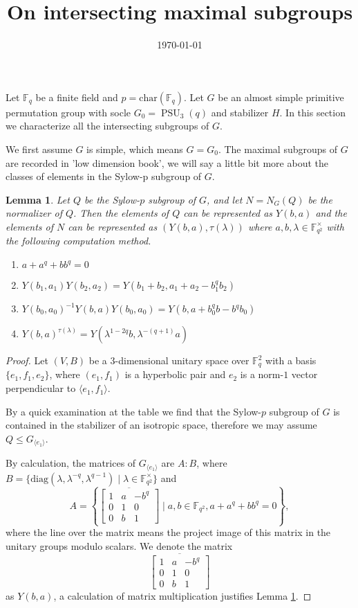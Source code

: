 \documentclass[12pt,reqno]{amsart}
\title[On intersecting maximal subgroups]{On intersecting maximal subgroups}
\date{\today}
\newcommand{\PSU}{\operatorname{PSU}}
\newcommand{\FF}{\mathbb{F}}
\newcommand{\lr}{\langle}
\newcommand{\rr}{\rangle}
\theoremstyle{plain}
\newtheorem{lemma}[proposition]{Lemma}
\theoremstyle{definition}
\begin{document}
	Let $\FF_q$ be a finite field and $p=\mathrm{char}(\FF_q)$. Let $G$ be an almost simple primitive permutation group with socle $G_0=\PSU_3(q)$ and stabilizer $H$. In this section we characterize all the intersecting subgroups of $G$. 
	
	We first assume  $G$ is simple, which means $G=G_0$. The maximal subgroups of $G$ are recorded in 'low dimension book', we will say a little bit more about the classes of elements in the Sylow-p subgroup of $G$.
	
	\begin{lemma}\label{Syl_p}
		Let $Q$ be the Sylow-$p$ subgroup of $G$, and let $N=N_G(Q)$ be the normalizer of $Q$. Then the elements of $Q$ can be represented as $Y(b,a)$ and the elements of $N$ can be represented as $(Y(b,a),\tau(\lambda))$ where $a, b,\lambda \in \FF_{q^2}^{\times}$ with the following computation method.
		\begin{enumerate}[\rm(i)]
			\item $a+a^q+bb^q=0$
			\item $Y(b_1,a_1)Y(b_2,a_2)=Y(b_1+b_2,a_1+a_2-b_1^qb_2)$
			\item $Y(b_0,a_0)^{-1}Y(b,a)Y(b_0,a_0)=Y(b,a+b_0^qb-b^qb_0)$
			\item 
			$Y(b,a)^{\tau(\lambda)}=Y(\lambda^{1-2q}b,\lambda^{-(q+1)}a)$
		\end{enumerate}
	\end{lemma}
\begin{proof}
	Let $(V,B)$ be a $3$-dimensional unitary space over $\FF_q^2$ with a basis $\{e_1,f_1,e_2\}$, where $(e_1,f_1)$ is a hyperbolic pair and $e_2$ is a norm-$1$ vector perpendicular to $\lr e_1, f_1\rr$.
	
	By a quick examination at the table we find that the Sylow-$p$ subgroup of $G$ is contained in the stabilizer of an isotropic space, therefore we may assume $Q\le G_{\lr e_1\rr}$.
	
	By calculation, the matrices of $G_{\lr e_1\rr}$ are $A{:}B$, where $B=\{\mathrm{diag}(\lambda,\lambda^{-q},\lambda^{q-1})\mid \lambda \in \FF_{q^2}^{\times} \}$ and 
	\begin{equation*}
		A=\left\{ \overline{\begin{bmatrix}
			1 & a & -b^q\\
			0 & 1 & 0 \\
			0 & b & 1
		\end{bmatrix}} \mid a, b\in \FF_{q^2},  a+a^q+bb^q=0  \right\},
	\end{equation*}
where the line over the matrix means the project image of this matrix in the unitary groups modulo scalars.
We denote the matrix $$\overline{\begin{bmatrix}
		1 & a & -b^q\\
	0 & 1 & 0 \\
	0 & b & 1
\end{bmatrix}}$$ as $Y(b,a)$, a calculation of matrix multiplication justifies Lemma \ref{Syl_p}.
\end{proof}
\end{document}
